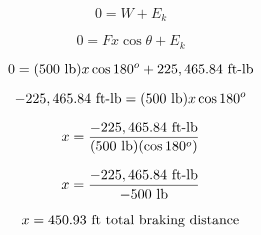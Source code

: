 $$0 = W + E_k$$

$$0 = F x \cos \theta + E_k$$

$$0 = (500 \hbox{ lb}) x \cos 180^o + 225,465.84 \hbox{ ft-lb}$$

$$-225,465.84 \hbox{ ft-lb} = (500 \hbox{ lb}) x \cos 180^o$$

$$x = {-225,465.84 \hbox{ ft-lb} \over (500 \hbox{ lb}) (\cos 180^o)}$$

$$x = {-225,465.84 \hbox{ ft-lb} \over -500 \hbox{ lb}}$$

$$x = 450.93 \hbox{ ft total braking distance}$$











